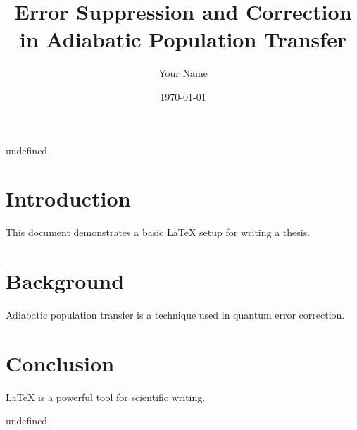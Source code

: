 undefined


\title{Error Suppression and Correction in Adiabatic Population Transfer}
\author{Your Name}
\date{\today}

\maketitle

\section{Introduction}
This document demonstrates a basic LaTeX setup for writing a thesis.

\section{Background}
Adiabatic population transfer is a technique used in quantum error correction.

\section{Conclusion}
LaTeX is a powerful tool for scientific writing.



undefined